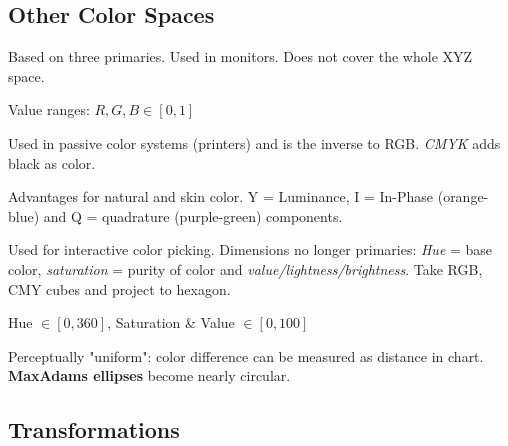\vspace{-10pt}
\subsection{Other Color Spaces}

\begin{definition}[RGB]
  Based on three primaries. Used in monitors. Does not cover the whole XYZ space.
\end{definition}

\begin{theorem}
  Value ranges: \(R, G, B \in [0, 1]\)
\end{theorem}

\begin{definition}[CMY]
  Used in passive color systems (printers) and is the inverse to RGB.
  \textit{CMYK} adds black as color.
\end{definition}

\begin{definition}[YIQ]
  Advantages for natural and skin color. Y = Luminance, I = In-Phase (orange-blue) and Q = quadrature (purple-green) components.
\end{definition}

\begin{definition}[HSV]
  Used for interactive color picking.
  Dimensions no longer primaries:
  \textit{Hue} = base color, \textit{saturation} = purity of color and \textit{value/lightness/brightness}. Take RGB, CMY cubes and project to hexagon.
\end{definition}

\begin{theorem}
  Hue \(\in [0, 360]\), Saturation \& Value \(\in [0, 100]\)
\end{theorem}

\begin{definition}
  Perceptually "uniform": color difference can be measured as distance in chart.
  \textbf{MaxAdams ellipses} become nearly circular.
\end{definition}

\subsection{Transformations}

